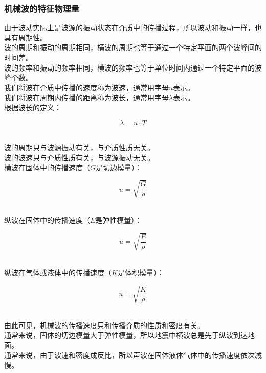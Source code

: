 \documentclass[UTF8]{ctexart}
\begin{document}
\newpage

\subsubsection{机械波的特征物理量}
    由于波动实际上是波源的振动状态在介质中的传播过程，所以波动和振动一样，也具有周期性。\\[3mm]
    波的周期和振动的周期相同，横波的周期也等于通过一个特定平面的两个波峰间的时间差。\\[3mm]
    波的频率和振动的频率相同，横波的频率也等于单位时间内通过一个特定平面的波峰个数。\\[5mm]
    我们将波在介质中传播的速度称为波速，通常用字母$u$表示。\\[3mm]
    我们将波在周期内传播的距离称为波长，通常用字母$\lambda$表示。\\[5mm]
    根据波长的定义：
    \begin{large}
        \begin{equation*}
            \lambda=u\cdot T
        \end{equation*}
    \end{large}\\
    波的周期只与波源振动有关，与介质性质无关。\\[3mm]
    波的波速只与介质性质有关，与波源振动无关。\\[3mm]
    横波在固体中的传播速度（$G$是切边模量）：
    \begin{large}
        \begin{equation*}
            u=\sqrt{\frac{G}{\rho}}
        \end{equation*}
    \end{large}\\
    纵波在固体中的传播速度（$E$是弹性模量）：
    \begin{large}
        \begin{equation*}
            u=\sqrt{\frac{E}{\rho}}
        \end{equation*}
    \end{large}\\
    纵波在气体或液体中的传播速度（$K$是体积模量）：
    \begin{large}
        \begin{equation*}
            u=\sqrt{\frac{K}{\rho}}
        \end{equation*}
    \end{large}\\
    由此可见，机械波的传播速度只和传播介质的性质和密度有关。\\[3mm]
    通常来说，固体的切边模量大于弹性模量，所以地震中横波总是先于纵波到达地面。\\[3mm]
    通常来说，由于波速和密度成反比，所以声波在固体液体气体中的传播速度依次减慢。
\end{document}
